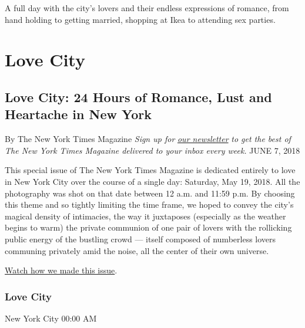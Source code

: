 A full day with the city's lovers and their endless expressions of
romance, from hand holding to getting married, shopping at Ikea to
attending sex parties.

\hypertarget{love-city}{%
\section{Love City}\label{love-city}}

\hypertarget{love-city-24-hours-of-romance-lust-and-heartache-in-new-york-1}{%
\subsection{Love City: 24 Hours of Romance, Lust and Heartache in New
York}\label{love-city-24-hours-of-romance-lust-and-heartache-in-new-york-1}}

 By The New York Times Magazine \emph{Sign up for}
\href{http://www.nytimes3xbfgragh.onion/newsletters/magazine}{\emph{our
newsletter}} \emph{to get the best of The New York Times Magazine
delivered to your inbox every week.} JUNE 7, 2018

This special issue of The New York Times Magazine is dedicated entirely
to love in New York City over the course of a single day: Saturday, May
19, 2018. All the photography was shot on that date between 12 a.m. and
11:59 p.m. By choosing this theme and so tightly limiting the time
frame, we hoped to convey the city's magical density of intimacies, the
way it juxtaposes (especially as the weather begins to warm) the private
communion of one pair of lovers with the rollicking public energy of the
bustling crowd --- itself composed of numberless lovers communing
privately amid the noise, all the center of their own universe.

\href{https://www.nytimes3xbfgragh.onion/video/magazine/100000005939102/new-york-issue-behind-the-scenes.html}{Watch
how we made this issue}.

\hypertarget{love-city-1}{%
\subsubsection{Love City}\label{love-city-1}}

New York City 00:00 AM

